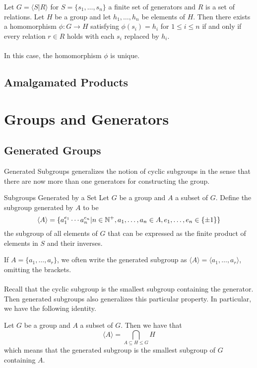 \documentclass[a4paper]{article}
\begin{document}
\begin{thm}{}{} Let $G=\langle S|R\rangle$ for $S=\{s_1,\dots,s_n\}$ a finite set of generators and $R$ is a set of relations. Let $H$ be a group and let $h_1,\dots,h_n$ be elements of $H$. Then there exists a homomorphism $\phi:G\to H$ satisfying $\phi(s_i)=h_i$ for $1\leq i\leq n$ if and only if every relation $r\in R$ holds with each $s_i$ replaced by $h_i$. \\~\\
In this case, the homomorphism $\phi$ is unique. 
\end{thm}

\subsection{Amalgamated Products}

\pagebreak
\section{Groups and Generators}
\subsection{Generated Groups}
Generated Subgroups generalizes the notion of cyclic subgroups in the sense that there are now more than one generators for constructing the group. 

\begin{defn}{Subgroups Generated by a Set}{} Let $G$ be a group and $A$ a subset of $G$. Define the subgroup generated by $A$ to be $$\langle A\rangle=\{a_1^{e_1}\cdots a_n^{e_n}|n\in\mathbb{N}^+, a_1,\dots,a_n\in A, e_1,\dots,e_n\in\{\pm1\}\}$$ the subgroup of all elements of $G$ that can be expressed as the finite product of elements in $S$ and their inverses. 
\end{defn}

If $A=\{a_1,\dots,a_r\}$, we often write the generated subgroup as $\langle A\rangle=\langle a_1,\dots,a_r\rangle$, omitting the brackets. \\~\\

Recall that the cyclic subgroup is the smallest subgroup containing the generator. Then generated subgroups also generalizes this particular property. In particular, we have the following identity. 

\begin{prp}{}{} Let $G$ be a group and $A$ a subset of $G$. Then we have that $$\langle A\rangle=\bigcap_{A\subseteq H\leq G}H$$ which means that the generated subgroup is the smallest subgroup of $G$ containing $A$. 
\end{prp}
\end{document}
